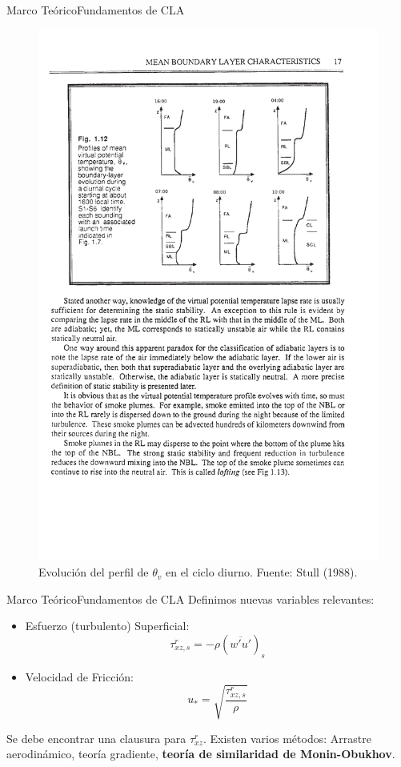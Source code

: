 \documentclass[mathserif,10pt]{beamer}
\newcommand{\be}{\begin{equation}}
\newcommand{\ee}{\end{equation}}
\begin{document}
\begin{frame}{Marco Teórico}{Fundamentos de CLA}
	\begin{figure}[h!]
		\centering
		\includegraphics[width=0.6\linewidth,trim={5.6cm 14cm 2.7cm 3.3cm},clip]{fig/03/pbl2}
		\caption{Evolución del perfil de $\theta_v$ en el ciclo diurno. Fuente: Stull (1988).}
		\label{fig:03_pbl2}
	\end{figure}
\end{frame}

\begin{frame}{Marco Teórico}{Fundamentos de CLA}
Definimos nuevas variables relevantes:
	\begin{itemize}
		\item Esfuerzo (turbulento) Superficial:
		\be 
		\tau^r_{xz,s} = - \rho (\overline{w'u'})_s
		\ee
		\item Velocidad de Fricción:
		\be u_* = \sqrt{\frac{\tau^r_{xz,s}}{\rho}} \ee
	\end{itemize}
Se debe encontrar una clausura para $\tau^r_{xz}$. Existen varios métodos: Arrastre aerodinámico, teoría gradiente, \textbf{teoría de similaridad de Monin-Obukhov}.
\end{frame}
\end{document}
